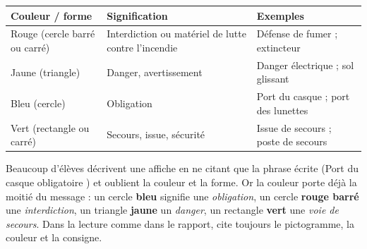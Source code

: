 \documentclass[11pt]{article}
\begin{document}
\begin{center}
\begin{tabularx}{\linewidth}{|l|X|X|}
\hline
\rowcolor{popblueL} \textbf{Couleur / forme} & \textbf{Signification} & \textbf{Exemples} \\
\hline
Rouge (cercle barré ou carré) & Interdiction ou matériel de lutte contre l'incendie & Défense de fumer ; extincteur \\
\hline
Jaune (triangle) & Danger, avertissement & Danger électrique ; sol glissant \\
\hline
Bleu (cercle) & Obligation & Port du casque ; port des lunettes \\
\hline
Vert (rectangle ou carré) & Secours, issue, sécurité & Issue de secours ; poste de secours \\
\hline
\end{tabularx}
\end{center}

\begin{attention}
Beaucoup d'élèves décrivent une affiche en ne citant que la phrase écrite (\og Port du casque obligatoire \fg{}) et oublient la couleur et la forme. Or la couleur porte déjà la moitié du message : un cercle \textbf{bleu} signifie une \emph{obligation}, un cercle \textbf{rouge barré} une \emph{interdiction}, un triangle \textbf{jaune} un \emph{danger}, un rectangle \textbf{vert} une \emph{voie de secours}. Dans la lecture comme dans le rapport, cite toujours le pictogramme, la couleur et la consigne.
\end{attention}
\end{document}
